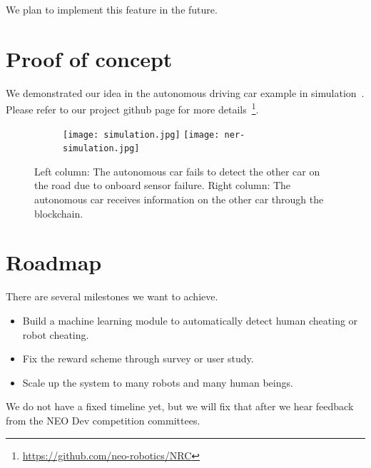 \documentclass{article}
\begin{document}
We plan to implement this feature in the future.

\section{Proof of concept}
\label{sec:proof-concept}


We demonstrated our idea in the autonomous driving car example
in simulation~. 
Please refer to our project github page for more
details~\footnote{\url{https://github.com/neo-robotics/NRC}}.

\begin{figure}[!h]
    \centering
    \begin{subfigure}{1.0\linewidth}
        \centering
        \texttt{[image: simulation.jpg]}
        \hspace{1.5cm}
        \texttt{[image: ner-simulation.jpg]}
    \end{subfigure}
    \caption{Left column:
        The autonomous car fails to detect the other car on
        the road due to onboard sensor failure.
        Right column:
        The autonomous car receives information on the other
        car through the \nrc blockchain.
    }
    \label{fig:nrc_simulation}
\end{figure}

\section{Roadmap}
\label{sec:roadmap}

There are several milestones we want to achieve.

\begin{itemize}
    \item Build a machine learning module to automatically detect
        human cheating or robot cheating.
    \item Fix the reward scheme through survey or user study.
    \item Scale up the \nrc system to many robots and many human 
        beings.
\end{itemize}

We do not have a fixed timeline yet, but we will fix that after
we hear feedback from the NEO Dev competition committees. 




\newpage

\small



\end{document}
